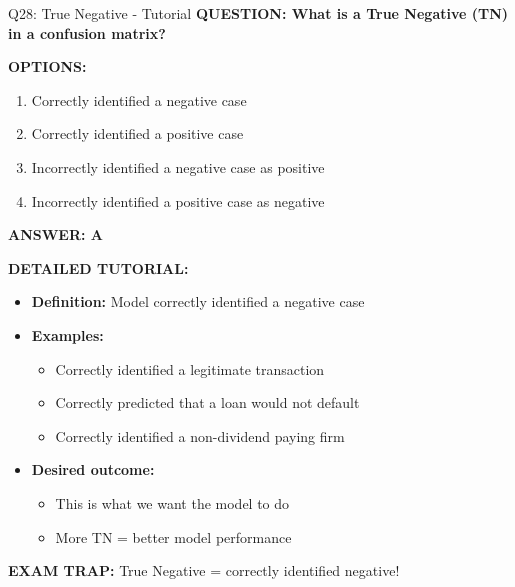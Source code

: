 \documentclass[8pt]{beamer}
\begin{document}
	\begin{frame}{Q28: True Negative - Tutorial}
		\fontsize{6.5}{7.5}\selectfont
		\textbf{QUESTION: What is a True Negative (TN) in a confusion matrix?}
		
		\vspace{0.1cm}
		\textbf{OPTIONS:}
		\begin{enumerate}
			\item Correctly identified a negative case
			\item Correctly identified a positive case
			\item Incorrectly identified a negative case as positive
			\item Incorrectly identified a positive case as negative
		\end{enumerate}
		
		\vspace{0.1cm}
		\textcolor{myblue}{\textbf{ANSWER: A}}
		
		\vspace{0.1cm}
		\textbf{DETAILED TUTORIAL:}
		\begin{itemize}
			\item \textbf{Definition:} Model correctly identified a negative case
			\item \textbf{Examples:}
			\begin{itemize}
				\item Correctly identified a legitimate transaction
				\item Correctly predicted that a loan would not default
				\item Correctly identified a non-dividend paying firm
			\end{itemize}
			\item \textbf{Desired outcome:}
			\begin{itemize}
				\item This is what we want the model to do
				\item More TN = better model performance
			\end{itemize}
		\end{itemize}
		
		\textcolor{myred}{\textbf{EXAM TRAP:}} True Negative = \textcolor{myblue}{correctly identified negative}!
	\end{frame}
	
\end{document}
